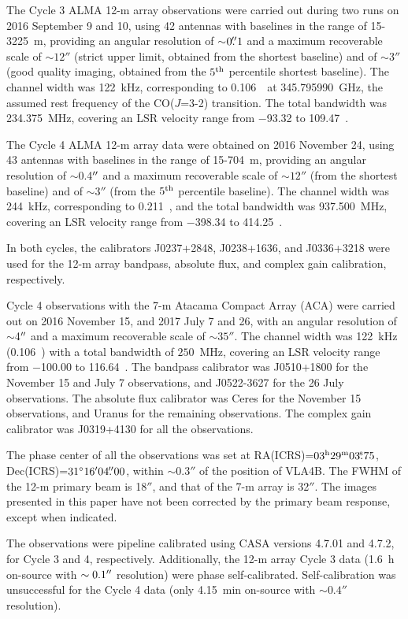 \documentclass[12pt]{mythesis}
\begin{document}
The Cycle 3 ALMA 12-m array observations were carried out during two runs on 2016 September 9 and 10, using 42 antennas with baselines in the range of 15-3225~m, providing an angular resolution of $\sim$$0\mbox{$.\!\!^{\prime\prime}$}1$ and a maximum recoverable scale of $\sim$$12''$ (strict upper limit, obtained from the shortest baseline) and of $\sim$$3''$ (good quality imaging, obtained from the $5^{\rm th}$ percentile shortest baseline). The channel width was 122~kHz, corresponding to 0.106~\kms\ at 345.795990~GHz, the assumed rest frequency of the CO($J$=3-2) transition. The total bandwidth was 234.375~MHz, covering an LSR velocity range from $-$93.32 to 109.47~\kms.

The Cycle 4 ALMA 12-m array data were obtained on 2016 November 24, using 43 antennas with baselines in the range of 15-704~m, providing an angular resolution of $\sim$0.4$\mbox{$^{\prime\prime}$}$ and a maximum recoverable scale of $\sim$$12''$ (from the shortest baseline) and of $\sim$$3''$ (from the $5^{\rm th}$ percentile baseline). The channel width was 244~kHz, corresponding to 0.211~\kms, and the total bandwidth was 937.500~MHz, covering an LSR velocity range from $-$398.34 to 414.25~\kms.

In both cycles, the calibrators J0237+2848, J0238+1636, and J0336+3218 were used for the 12-m array bandpass, absolute flux, and complex gain calibration, respectively.


Cycle 4 observations with the 7-m Atacama Compact Array (ACA) were carried out on 2016 November 15, and 2017 July 7 and 26, with an angular resolution of $\sim$4$\mbox{$^{\prime\prime}$}$ and a maximum recoverable scale of $\sim$$35''$. The channel width was 122~kHz (0.106~\kms) with a total bandwidth of $250$~MHz, covering an LSR velocity range from $-$100.00 to 116.64~\kms. The bandpass calibrator was J0510+1800 for the November 15 and July 7 observations, and J0522-3627 for the 26 July observations. The absolute flux calibrator was Ceres for the November 15 observations, and Uranus for the remaining observations. The complex gain calibrator was J0319+4130 for all the observations. 


The phase center of all the observations was set at RA(ICRS)=$03^\mathrm{h}29^\mathrm{m}03\mbox{$.\!\!^{\mathrm s}$}75$, Dec(ICRS)=$31^\circ16\mbox{$^\prime$} 04\mbox{$.\!\!^{\prime\prime}$} 00$, within $\sim$$0.3''$ of the position of VLA4B. The FWHM of the 12-m primary beam is 18$''$, and that of the 7-m array is 32$''$. The images presented in this paper have not been corrected by the primary beam response, except when indicated. 

The observations were pipeline calibrated using CASA versions 4.7.01 and 4.7.2, for Cycle 3 and 4, respectively. Additionally, the 12-m array Cycle 3 data (1.6~h on-source with $\sim 0.1\mbox{$^{\prime\prime}$}$ resolution) were phase self-calibrated. Self-calibration was unsuccessful for the Cycle 4 data (only 4.15~min on-source with $\sim 0.4''$ resolution). 
\end{document}
